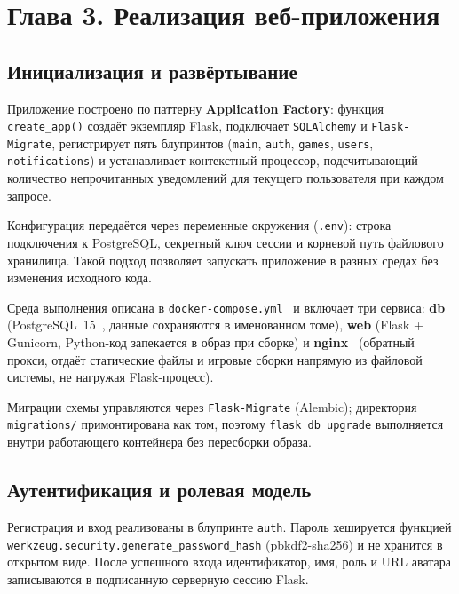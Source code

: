 
\section*{Глава 3. Реализация веб-приложения}

\subsection{Инициализация и развёртывание}

Приложение построено по паттерну \textbf{Application Factory}: функция
\texttt{create\_app()} создаёт экземпляр Flask, подключает \texttt{SQLAlchemy}
и \texttt{Flask-Migrate}, регистрирует пять блупринтов (\texttt{main},
\texttt{auth}, \texttt{games}, \texttt{users}, \texttt{notifications}) и
устанавливает контекстный процессор, подсчитывающий количество непрочитанных
уведомлений для текущего пользователя при каждом запросе.

Конфигурация передаётся через переменные окружения (\texttt{.env}): строка
подключения к PostgreSQL, секретный ключ сессии и корневой путь файлового
хранилища. Такой подход позволяет запускать приложение в разных средах без
изменения исходного кода.

Среда выполнения описана в \texttt{docker-compose.yml}~\cite{docker_docs} и включает
три сервиса: \textbf{db} (PostgreSQL~15~\cite{postgresql_docs}, данные сохраняются в
именованном томе), \textbf{web} (Flask + Gunicorn, Python-код запекается в образ при
сборке) и \textbf{nginx}~\cite{nginx_docs} (обратный прокси, отдаёт статические файлы
и игровые сборки напрямую из файловой системы, не нагружая Flask-процесс).

Миграции схемы управляются через \texttt{Flask-Migrate} (Alembic); директория
\texttt{migrations/} примонтирована как том, поэтому \texttt{flask db upgrade}
выполняется внутри работающего контейнера без пересборки образа.

\subsection{Аутентификация и ролевая модель}

Регистрация и вход реализованы в блупринте \texttt{auth}. Пароль хешируется
функцией \texttt{werkzeug.security.generate\_password\_hash} (pbkdf2-sha256)
и не хранится в открытом виде. После успешного входа идентификатор,
имя, роль и URL аватара записываются в подписанную серверную сессию Flask.


